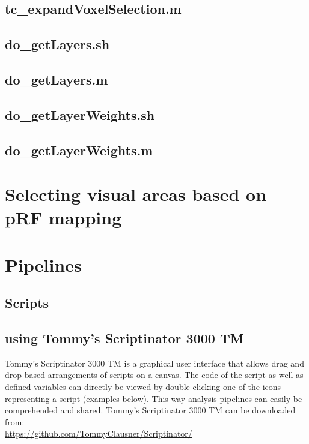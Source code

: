 \documentclass[12pt,a4paper]{scrartcl}
\begin{document}
\subsection{tc\_expandVoxelSelection.m}

\subsection{do\_getLayers.sh}
\label{sec:getLyr}

\subsection{do\_getLayers.m}

\subsection{do\_getLayerWeights.sh}
\label{sec:getLyrW}

\subsection{do\_getLayerWeights.m}

\section{Selecting visual areas based on pRF mapping}
\label{sec:GUIprf}

\section{Pipelines}
\label{sec:pipelines}
\subsection{Scripts}
\subsection{using Tommy's Scriptinator 3000 TM}
\label{sec:scriptinator}
Tommy's Scriptinator 3000 TM is a graphical user interface that allows drag and drop based arrangements of scripts on a canvas. The code of the script as well as defined variables can directly be viewed by double clicking one of the icons representing a script (examples below). This way analysis pipelines can easily be comprehended and shared. Tommy's Scriptinator 3000 TM can be downloaded from:\\

\href{https://github.com/TommyClausner/Scriptinator/}{https://github.com/TommyClausner/Scriptinator/}\\
\end{document}
